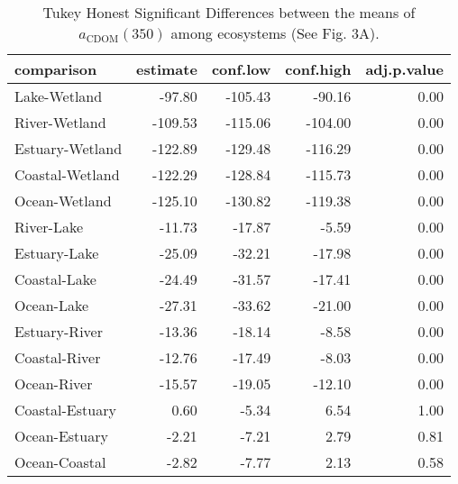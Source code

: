 \begin{table}[ht]
\centering
\begin{tabular}{lrrrr}
  \hline
comparison & estimate & conf.low & conf.high & adj.p.value \\ 
  \hline
Lake-Wetland & -97.80 & -105.43 & -90.16 & 0.00 \\ 
  River-Wetland & -109.53 & -115.06 & -104.00 & 0.00 \\ 
  Estuary-Wetland & -122.89 & -129.48 & -116.29 & 0.00 \\ 
  Coastal-Wetland & -122.29 & -128.84 & -115.73 & 0.00 \\ 
  Ocean-Wetland & -125.10 & -130.82 & -119.38 & 0.00 \\ 
  River-Lake & -11.73 & -17.87 & -5.59 & 0.00 \\ 
  Estuary-Lake & -25.09 & -32.21 & -17.98 & 0.00 \\ 
  Coastal-Lake & -24.49 & -31.57 & -17.41 & 0.00 \\ 
  Ocean-Lake & -27.31 & -33.62 & -21.00 & 0.00 \\ 
  Estuary-River & -13.36 & -18.14 & -8.58 & 0.00 \\ 
  Coastal-River & -12.76 & -17.49 & -8.03 & 0.00 \\ 
  Ocean-River & -15.57 & -19.05 & -12.10 & 0.00 \\ 
  Coastal-Estuary & 0.60 & -5.34 & 6.54 & 1.00 \\ 
  Ocean-Estuary & -2.21 & -7.21 & 2.79 & 0.81 \\ 
  Ocean-Coastal & -2.82 & -7.77 & 2.13 & 0.58 \\ 
   \hline
\end{tabular}
\caption{Tukey Honest Significant Differences between the means of $a_{\text{CDOM}}(350)$ among ecosystems (See Fig. 3A).} 
\end{table}
